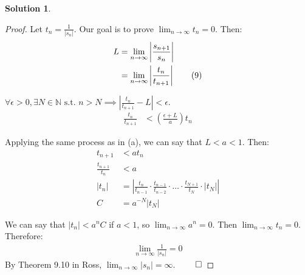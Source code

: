 \documentclass[12pt]{article}
\theoremstyle{definition} %
\newtheorem{solution}{Solution}
\theoremstyle{plain} %
\begin{document}
\begin{solution}
\begin{enumerate}
    \begin{proof}
        Let $t_n = \frac{1}{|s_n|}$. Our goal is to prove $\lim_{n \to \infty} t_n = 0.$ Then:
        \begin{align}
            L &= \lim_{n \to \infty} \left| \frac{s_{n+1}}{s_n} \right| \notag \\
            &= \lim_{n \to \infty} \left| \frac{t_n}{t_{n+1}} \right| \tag{9}
        \end{align}
    
        $\forall \epsilon > 0, \exists N \in \mathbb{N} \text{ s.t. } n > N \implies \left| \frac{t_n}{t_{n+1}} - L \right| < \epsilon.$
        \begin{align}
            \frac{t_n}{t_{n+1}} &< \left( \frac{\epsilon + L}{a} \right) t_n \tag{11}
        \end{align}
    
        Applying the same process as in (a), we can say that $L < a < 1.$ Then:
        \begin{align}
            t_{n+1} &< at_n \tag{12} \\
            \frac{t_{n+1}}{t_n} &< a \tag{13} \\
            |t_n| &= \left| \frac{t_n}{t_{n-1}} \cdot \frac{t_{n-1}}{t_{n-2}} \cdot \dots \cdot \frac{t_{N+1}}{t_N} \cdot |t_N| \right| \tag{14} \\
            C &= a^{-N} |t_N| \tag{15}
        \end{align}
    
        We can say that $|t_n| < a^n C$ if $a < 1$, so $\lim_{n \to \infty} a^n = 0.$ Then $\lim_{n \to \infty} t_n = 0.$ Therefore:
        \begin{align}
            \lim_{n \to \infty} \frac{1}{|s_n|} = 0 \tag{16}
        \end{align}
        By Theorem 9.10 in Ross, $\lim_{n \to \infty} |s_n| = \infty.$ $\qed$
    \end{proof}

    \end{enumerate}
    \end{solution}
\end{document}
